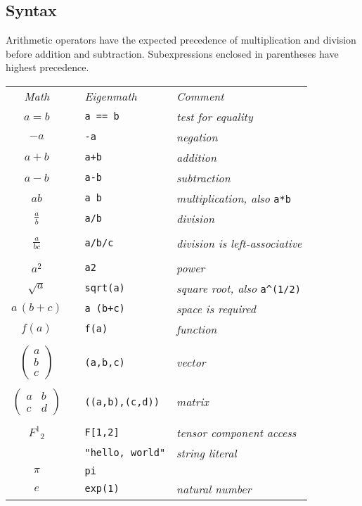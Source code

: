 \subsection{Syntax}
Arithmetic operators have the expected precedence of
multiplication and division before addition and subtraction.
Subexpressions enclosed in parentheses have highest precedence.

\begin{center}
\begin{tabular}{clll}
{\it Math} & & {\it Eigenmath} & {\it Comment}
\\[1ex]
$a=b$ & & \verb$a == b$ & {\it test for equality}
\\[1ex]
$-a$ & & {\tt -a} & {\it negation}
\\[1ex]
$a+b$ & & {\tt a+b} & {\it addition}
\\[1ex]
$a-b$ & & {\tt a-b} & {\it subtraction}
\\[1ex]
$ab$ & & {\tt a b} & {\it multiplication, also} \verb$a*b$
\\[1ex]
$\displaystyle\frac{a}{b}$ & & {\tt a/b} & {\it division}
\\
\\
$\displaystyle\frac{a}{bc}$ & & {\tt a/b/c} & {\it division is left-associative}
\\
\\
$a^2$ & & {\tt a{\char94}2} & {\it power}
\\[1ex]
$\sqrt{a}$ & & \verb$sqrt(a)$ & {\it square root, also} \verb$a^(1/2)$
\\[1ex]
$a\,(b+c)$ & & {\tt a (b+c)} & {\it space is required}
\\[1ex]
$f(a)$ & & {\tt f(a)} & {\it function}
\\
\\
$\begin{pmatrix}a\\ b\\ c\end{pmatrix}$ & & {\tt (a,b,c)} & {\it vector}
\\
\\
$\begin{pmatrix}a&b\\ c&d\end{pmatrix}$ & & {\tt ((a,b),(c,d))} & {\it matrix}
\\\\
$F^1{}_2$ & & {\tt F[1,2]} & {\it tensor component access}
\\[1ex]
 & & \verb$"hello, world"$ & {\it string literal}
\\[1ex]
$\pi$ & & {\tt pi} &
\\[1ex]
$e$ && {\tt exp(1)} & {\it natural number}
\end{tabular}
\end{center}
